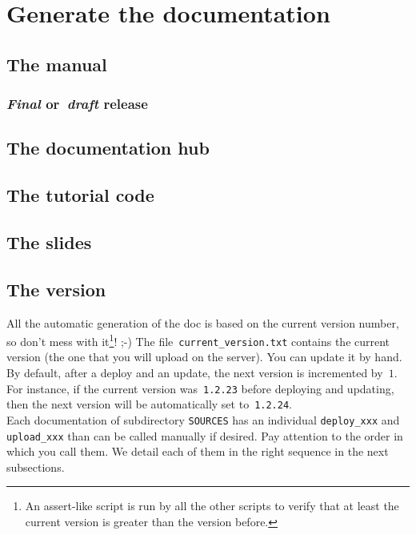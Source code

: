 \documentclass[a4paper,10pt]{article}
\begin{document}
\section{Generate the documentation}
\label{generate_documentation}

\subsection{The manual}

\subsubsection{\emph{Final} or~\emph{draft} release}
\label{final_draft_mode}

\subsection{The documentation hub}
\label{generate_documentation_hub}

\subsection{The tutorial code}

\subsection{The slides}

\subsection{The version}
All the automatic generation of the doc is based on the current version number, so don't mess with it\footnote{An assert-like script is run by all the other scripts to verify that at least the current version is
greater than the version before.}! ;-) 
The file~\verb+current_version.txt+ contains the current version (the one that you will upload on the server). You can update it by hand. By default, after a deploy and an update, the next version is incremented by~$1$. For instance, if the current version was~\verb+1.2.23+ before deploying and updating, then the next version will be automatically set to~\verb+1.2.24+.\\

Each documentation of subdirectory \verb+SOURCES+  has an individual \verb+deploy_xxx+ and \verb+upload_xxx+ than can be called manually if desired. Pay attention to the order in which you call them.
 We detail each of them in the right sequence in the next subsections.
\end{document}
